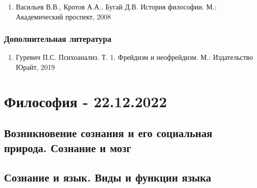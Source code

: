 \documentclass{article}
\begin{document}
\begin{enumerate}
    \item Васильев В.В., Кротов А.А., Бугай Д.В. История философии. М.: Академический проспект, 2008
\end{enumerate}

\subsubsection{Дополнительная литература}

\begin{enumerate}
    \item Гуревич П.С. Психоанализ. Т. 1. Фрейдизм и неофрейдизм. М.: Издательство Юрайт, 2019
\end{enumerate}

\section{Философия - 22.12.2022}

\subsection{Возникновение сознания и его социальная природа. Сознание и мозг}

\subsection{Сознание и язык. Виды и функции языка}
\end{document}

